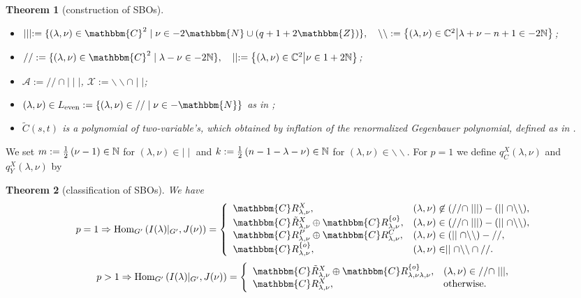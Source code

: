 \documentclass[12pt]{article} %
\newcommand{\assign}{:=}
\newcommand{\nin}{\not\in}
\newcommand{\tmop}[1]{\ensuremath{\operatorname{#1}}}
\newtheorem{theorem}{Theorem}
\newcommand{\Hom}{\mbox{\normalfont Hom}}
\theoremstyle{definition}
\theoremstyle{exampstyle} \newtheorem{examp}[theorem]{Theorem}
\newcommand{\IlambdaGprime}{I(\lambda)\kern-0.3em\mid_{G'}}
\newcommand{\SBO}{\Hom_{G'}\left(\IlambdaGprime,J(\nu) \right)}
\newcommand{\mm}{\mid\mid}
\newcommand{\bb}{\backslash\backslash}
\begin{document}
\begin{theorem}[construction of SBOs]
\begin{itemize}
	\item $\mid \mid \mid \assign \{ (\lambda, \nu) \in \mathbbm{C}^2 \mid \nu \in
	- 2\mathbbm{N} \cup (q + 1 + 2\mathbbm{Z}) \},\quad \backslash\backslash:=\mysetn{(\lambda,\nu)\in\C^2}{\lambda+\nu-n+1\in-2\N}$;
\item $/ / \assign
\{ (\lambda, \nu) \in \mathbbm{C}^2 \mid \lambda - \nu \in
-2\N \},\quad \mid\mid:=\mysetn{(\lambda,\nu)\in\C^2}{\nu\in1+2\N}$;
\item $\mathcal{A}:=//\cap\mid\mid\mid$, $\mathcal{X}:=\backslash\backslash \cap \mid \mid$;
\item $(\lambda, \nu) \in L_{\tmop{even}} \assign \{ (\lambda, \nu) \in / / \mid \nu
\in -\mathbbm{N} \}$ as in \cite{kobayashi2015symmetry};
\item $\tilde{C}(s,t)$ is a polynomial of two-variable's, which obtained by inflation of the renormalized Gegenbauer polynomial, defined as in \cite[(16.3)]{kobayashi2015symmetry}.
\end{itemize}
\end{theorem}
We set $m:=\frac{1}{2}\left( \nu-1 \right)\in\mathbb{N}$ for $(\lambda,\nu)\in\mm$ and $k:=\frac{1}{2}\left( n-1-\lambda-\nu \right)\in\mathbb{N}$ for $(\lambda,\nu)\in\bb$.
For $p=1$ we define $q_C^X(\lambda,\nu)$ and $q_Y^X(\lambda,\nu)$ by
\vspace{-3ex}
\begin{theorem}[classification of SBOs]
  We have\vspace{-1.5ex}
\[ p = 1 \Rightarrow \SBO = \left\{
   \begin{array}{ll}
     \mathbbm{C}R^X_{\lambda, \nu}, & (\lambda, \nu) \nin (/ /
     \cap \mid \mid \mid) - (\mid \mid \cap \backslash\backslash),\\
     \mathbbm{C} \tilde{R}^X_{\lambda, \nu} \oplus \mathbbm{C}R^{\{ o
     \}}_{\lambda, \nu}, & (\lambda, \nu) \in (/ / \cap \mid \mid \mid) -
     (\mid \mid \cap \backslash\backslash),\\
     \mathbbm{C}R^P_{\lambda, \nu} \oplus \mathbbm{C}R^C_{\lambda, \nu}, &
     (\lambda, \nu) \in (\mid \mid \cap \backslash\backslash) - / /,\\
     \mathbbm{C}R^{\{ o \}}_{\lambda, \nu}, & (\lambda, \nu) \in \mid \mid
     \cap \backslash\backslash \cap / /.
   \end{array} \right. \]
\[ p > 1 \Rightarrow \SBO = \left\{
   \begin{array}{ll}
     \mathbbm{C} \tilde{R}^X_{\lambda, \nu} \oplus \mathbbm{C}R^{\{ o
     \}}_{\lambda, \nu \lambda, \nu}, & (\lambda, \nu) \in / / \cap \mid \mid
     \mid,\\
     \mathbbm{C}R^X_{\lambda, \nu}, & \tmop{otherwise.}
   \end{array} \right. \]
\end{theorem}
\end{document}

